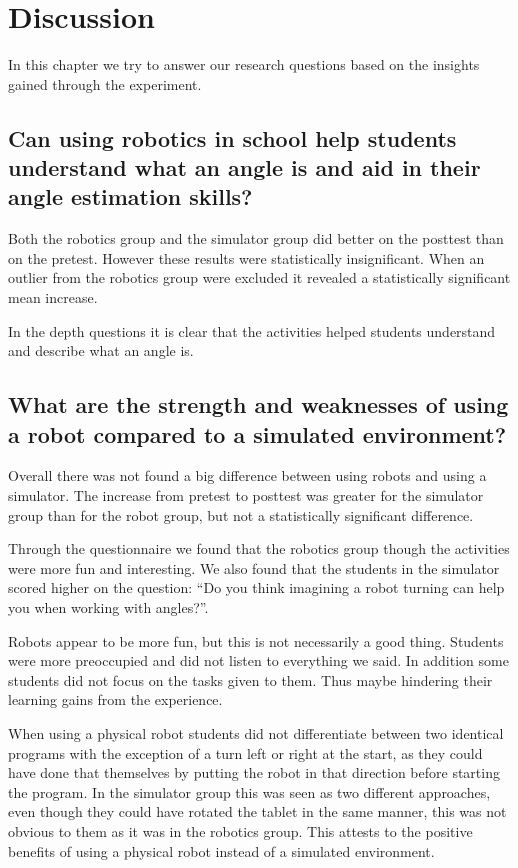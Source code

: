 \chapter{Discussion}
In this chapter we try to answer our research questions based on the insights gained through the experiment. 

\section{Can using robotics in school help students understand what an angle is and aid in their angle estimation skills?}
Both the robotics group and the simulator group did better on the posttest than on the pretest. However these results were statistically insignificant. When an outlier from the robotics group were excluded it revealed a statistically significant mean increase. 

In the depth questions it is clear that the activities helped students understand and describe what an angle is. 

\section{What are the strength and weaknesses of using a robot compared to a simulated environment?}
Overall there was not found a big difference between using robots and using a simulator.
The increase from pretest to posttest was greater for the simulator group than for the robot group, but not a statistically significant difference. 

Through the questionnaire we found that the robotics group though the activities were more fun and interesting. We also found that the students in the simulator scored higher on the question: ``Do you think imagining a robot turning can help you
when working with angles?''. 

Robots appear to be more fun, but this is not necessarily a good thing. Students were more preoccupied and did not listen to everything we said. In addition some students did not focus on the tasks given to them. Thus maybe hindering their learning gains from the experience. 

When using a physical robot students did not differentiate between two identical programs with the exception of a turn left or right at the start, as they could have done that themselves by putting the robot in that direction before starting the program. In the simulator group this was seen as two different approaches, even though they could have rotated the tablet in the same manner, this was not obvious to them as it was in the robotics group. This attests to the positive benefits of using a physical robot instead of a simulated environment. 

